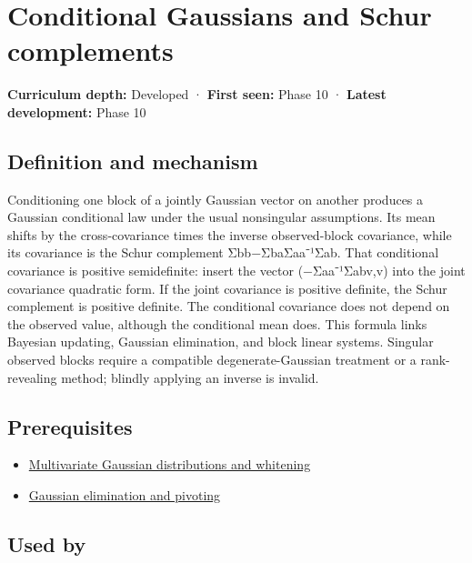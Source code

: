 \hypertarget{appendix-f0437ea55a47}{}\label{referencestart:appendix-f0437ea55a47}
\section{Conditional Gaussians and Schur complements}\label{appendix-f0437ea55a47-conditional-gaussians-and-schur-complements}

\textbf{Curriculum depth:} Developed · \textbf{First seen:} Phase 10 · \textbf{Latest development:} Phase 10

\subsection{Definition and mechanism}\label{appendix-f0437ea55a47-definition-and-mechanism}

Conditioning one block of a jointly Gaussian vector on another produces a Gaussian conditional law under the usual nonsingular assumptions. Its mean shifts by the cross-covariance times the inverse observed-block covariance, while its covariance is the Schur complement Σbb−ΣbaΣaa⁻¹Σab. That conditional covariance is positive semidefinite: insert the vector (−Σaa⁻¹Σabv,v) into the joint covariance quadratic form. If the joint covariance is positive definite, the Schur complement is positive definite. The conditional covariance does not depend on the observed value, although the conditional mean does. This formula links Bayesian updating, Gaussian elimination, and block linear systems. Singular observed blocks require a compatible degenerate-Gaussian treatment or a rank-revealing method; blindly applying an inverse is invalid.

\subsection{Prerequisites}\label{appendix-f0437ea55a47-prerequisites}

\begin{itemize}
\tightlist
\item
  \hyperref[appendix-12bbe185dbe5]{Multivariate Gaussian distributions and whitening}
\item
  \hyperref[appendix-f6e77f4a200f]{Gaussian elimination and pivoting}
\end{itemize}

\subsection{Used by}\label{appendix-f0437ea55a47-used-by}

